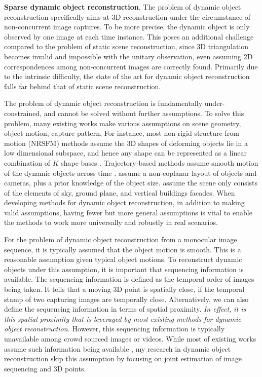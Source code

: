 \textbf{Sparse dynamic object reconstruction}.
The problem of dynamic object reconstruction specifically aims at 3D reconstruction under the circumstance of non-concurrent image captures. To be more precise, the dynamic object is only observed by one image at each time instance. This poses an additional challenge compared to the problem of static  scene reconstruction, since 3D triangulation becomes invalid and impossible with the unitary observation, even assuming 2D correspondences among non-concurrent images are correctly found. Primarily due to the intrinsic difficulty, the state of the art for dynamic object reconstruction falls far behind that of static scene reconstruction.

The problem of dynamic object reconstruction is fundamentally under-constrained, and cannot be solved without further assumptions. To solve this problem, many existing works make various assumptions on scene geometry, object motion, capture pattern, \etc For instance, most non-rigid structure from motion (NRSFM) methods assume the 3D shapes of deforming objects lie in a low dimensional subspace, and hence any shape can be represented as a linear combination of $K$ shape bases \cite{Bregler_CVPR2000,torresani2008nonrigid,dai2014simple}. Trajectory-based methods assume smooth motion of the dynamic objects across time \cite{Akhter_NIPS08}. \citet{bao2011toward} assume a non-coplanar layout of objects and cameras, plus a prior knowledge of the object size.  
\citet{Hoiem_CGRAPH2005} assume the scene only consists of the elements of sky, ground plane, and vertical buildings facades. When developing methods for dynamic object reconstruction, in addition to making valid assumptions, having fewer but more general assumptions is vital to enable the methods to work more universally and robustly in real scenarios. 

 For the problem of dynamic object reconstruction from a monocular image sequence, it is typically assumed that the object motion is smooth. This is a reasonable assumption given typical object motions. To reconstruct dynamic objects under this assumption, it is important that sequencing information is available. The sequencing information is defined as the temporal order of images being taken. It tells that a moving 3D point is spatially close, if the temporal stamp of two capturing images are temporally close. Alternatively, we can also define the sequencing information in terms of spatial proximity. \emph{In effect, it is this spatial proximity that is leveraged by most existing methods for dynamic object reconstruction.} However, this sequencing information is typically unavailable among crowd sourced images or videos. While most of existing works assume such information being available \cite{Park_ECCV2010,Park_ICCV2011,Valmadre_ECCV2012,Valmadre_CVPR2012}, my research in dynamic object reconstruction skip this assumption by focusing on joint estimation of image sequencing and 3D points.

